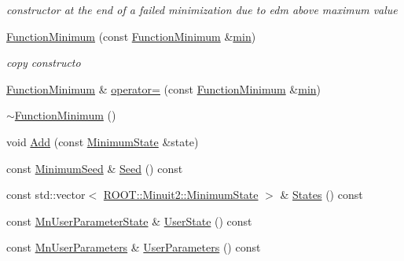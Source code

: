 \begin{DoxyCompactItemize}
\begin{DoxyCompactList}\small\item\em constructor at the end of a failed minimization due to edm above maximum value \end{DoxyCompactList}\item 
\mbox{\hyperlink{classROOT_1_1Minuit2_1_1FunctionMinimum_a79c734eb76f50e7638255095bd0670aa}{Function\+Minimum}} (const \mbox{\hyperlink{classROOT_1_1Minuit2_1_1FunctionMinimum}{Function\+Minimum}} \&\mbox{\hyperlink{adat__devel_2lib_2SU3_2SU3__internal_8h_ab0f5fed3171eb00d1c5f037d9f518a23}{min}})
\begin{DoxyCompactList}\small\item\em copy constructo \end{DoxyCompactList}\item 
\mbox{\hyperlink{classROOT_1_1Minuit2_1_1FunctionMinimum}{Function\+Minimum}} \& \mbox{\hyperlink{classROOT_1_1Minuit2_1_1FunctionMinimum_a107909f1a994436795eb310f951f14cb}{operator=}} (const \mbox{\hyperlink{classROOT_1_1Minuit2_1_1FunctionMinimum}{Function\+Minimum}} \&\mbox{\hyperlink{adat__devel_2lib_2SU3_2SU3__internal_8h_ab0f5fed3171eb00d1c5f037d9f518a23}{min}})
\item 
\mbox{\hyperlink{classROOT_1_1Minuit2_1_1FunctionMinimum_aaaef452fc02a74a63a9390329ed1dd04}{$\sim$\+Function\+Minimum}} ()
\item 
void \mbox{\hyperlink{classROOT_1_1Minuit2_1_1FunctionMinimum_a13b69e2d431d568f4485eb8b79d6c781}{Add}} (const \mbox{\hyperlink{classROOT_1_1Minuit2_1_1MinimumState}{Minimum\+State}} \&state)
\item 
const \mbox{\hyperlink{classROOT_1_1Minuit2_1_1MinimumSeed}{Minimum\+Seed}} \& \mbox{\hyperlink{classROOT_1_1Minuit2_1_1FunctionMinimum_a9812689b192b202a73ce1178e8098705}{Seed}} () const
\item 
const std\+::vector$<$ \mbox{\hyperlink{classROOT_1_1Minuit2_1_1MinimumState}{R\+O\+O\+T\+::\+Minuit2\+::\+Minimum\+State}} $>$ \& \mbox{\hyperlink{classROOT_1_1Minuit2_1_1FunctionMinimum_a5f08def4f7ca92700393d42ded6eb237}{States}} () const
\item 
const \mbox{\hyperlink{classROOT_1_1Minuit2_1_1MnUserParameterState}{Mn\+User\+Parameter\+State}} \& \mbox{\hyperlink{classROOT_1_1Minuit2_1_1FunctionMinimum_a698dc320ec24e2288f391f160ef8213e}{User\+State}} () const
\item 
const \mbox{\hyperlink{classROOT_1_1Minuit2_1_1MnUserParameters}{Mn\+User\+Parameters}} \& \mbox{\hyperlink{classROOT_1_1Minuit2_1_1FunctionMinimum_ac916253d7e29de7da4da5bf4b84a2ad5}{User\+Parameters}} () const

\end{DoxyCompactItemize}
